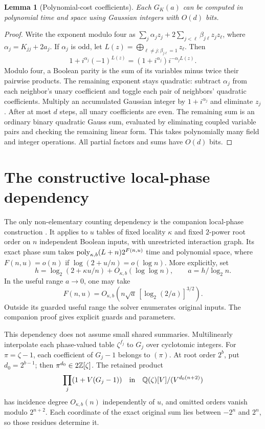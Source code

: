 \documentclass[11pt,a4paper]{article}
\newtheorem{lemma}[theorem]{Lemma}
\theoremstyle{remark}\newtheorem{remark}[theorem]{Remark}
\begin{document}
\begin{lemma}[Polynomial-cost coefficients]\label{lem:gauss}
Each $G_K(a)$ can be computed in polynomial time and space using
Gaussian integers with $O(d)$ bits.
\end{lemma}
\begin{proof}
Write the exponent modulo four as
$\sum_j\alpha_jz_j+2\sum_{j<\ell}\beta_{j\ell}z_jz_\ell$,
where $\alpha_j=K_{jj}+2a_j$. If $\alpha_j$ is odd, let
$L(z)=\bigoplus_{\ell\ne j:\beta_{j\ell}=1}z_\ell$. Then
\[
1+i^{\alpha_j}(-1)^{L(z)}
=(1+i^{\alpha_j})i^{-\alpha_j L(z)}.
\]
Modulo four, a Boolean parity is the sum of its variables minus
twice their pairwise products. The remaining exponent stays
quadratic: subtract $\alpha_j$ from each neighbor's unary
coefficient and toggle each pair of neighbors' quadratic
coefficients. Multiply an accumulated Gaussian integer by
$1+i^{\alpha_j}$ and eliminate $z_j$. After at most $d$ steps,
all unary coefficients are even. The remaining sum is an
ordinary binary quadratic Gauss sum, evaluated by eliminating
coupled variable pairs and checking the remaining linear form.
This takes polynomially many field and integer operations.
All partial factors and sums have $O(d)$ bits.
\end{proof}

\section{The constructive local-phase dependency}\label{sec:phase}
The only non-elementary counting dependency is the companion
local-phase construction \cite{phase}. It applies to $u$ tables
of fixed locality $\kappa$ and fixed $2$-power root order on
$n$ independent Boolean inputs, with unrestricted interaction
graph. Its exact phase sum takes
$\operatorname{poly}_{\kappa,b}(L+n)2^{F(n,u)}$ time and polynomial space,
where $F(n,u)=o(n)$ if $\log(2+u/n)=o(\log n)$. More explicitly,
set
\[
h=\log_2(2+\kappa u/n)+O_{\kappa,b}(\log\log n),
\qquad a=h/\log_2n.
\]
In the useful range $a\to0$, one may take
\begin{equation}\label{eq:phaseexp}
F(n,u)=O_{\kappa,b}\!\left(
n\sqrt a\, [\log_2(2/a)]^{3/2}\right).
\end{equation}
Outside its guarded useful range the solver enumerates original
inputs. The companion proof gives explicit guards and parameters.

This dependency does not assume small shared summaries.
Multilinearly interpolate each phase-valued table $\zeta^{f_j}$ to $G_j$ over cyclotomic
integers. For $\pi=\zeta-1$, each coefficient of $G_j-1$
belongs to $(\pi)$. At root order $2^b$, put $d_0=2^{b-1}$;
then $\pi^{d_0}\in2\mathbb Z[\zeta]$. The retained product
\[
\prod_j(1+V(G_j-1))
\quad\hbox{in}\quad
\mathbb Q(\zeta)[V]/(V^{d_0(n+2)})
\]
has incidence degree $O_{\kappa,b}(n)$ independently of $u$,
and omitted orders vanish modulo $2^{n+2}$. Each coordinate
of the exact original sum lies between $-2^n$ and $2^n$,
so those residues determine it.
\end{document}

